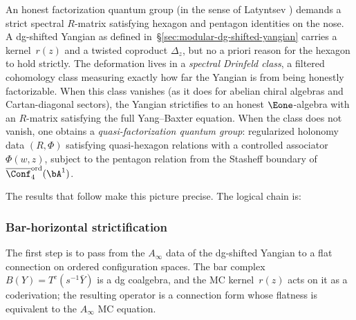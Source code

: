 An honest factorization quantum group (in the sense of
Latyntsev \cite{Latyntsev23}) demands a strict spectral
$R$-matrix satisfying hexagon and pentagon identities on the nose.
A dg-shifted Yangian as defined in~\S\ref{sec:modular-dg-shifted-yangian}
carries a kernel~$r(z)$ and a twisted coproduct
$\Delta_z$, but no a priori reason for the hexagon to hold
strictly. The deformation lives in a \emph{spectral Drinfeld
class}, a filtered cohomology class measuring
exactly how far the Yangian is from being honestly factorizable.
When this class vanishes (as it does for abelian chiral algebras
and Cartan-diagonal sectors), the Yangian strictifies to an
honest $\Eone$-algebra with an $R$-matrix satisfying the full
Yang--Baxter equation. When the class does not vanish, one obtains
a \emph{quasi-factorization quantum group}: regularized holonomy
data $(R,\Phi)$ satisfying quasi-hexagon relations with a
controlled associator $\Phi(w,z)$, subject to the pentagon
relation from the Stasheff boundary of
$\overline{\Conf}_4^{\mathrm{ord}}(\bA^1)$.

The results that follow make this picture precise.
The logical chain is:
\begin{center}
\end{center}

\subsubsection{Bar-horizontal strictification}

The first step is to pass from the $A_\infty$ data of the
dg-shifted Yangian to a flat connection on ordered configuration
spaces. The bar complex $B(Y) = T^c(s^{-1}\bar{Y})$ is a
dg coalgebra, and the MC kernel~$r(z)$ acts on it as a
coderivation; the resulting operator is a connection form whose
flatness is equivalent to the $A_\infty$ MC equation.

